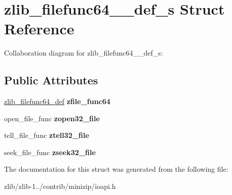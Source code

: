 \hypertarget{structzlib__filefunc64__32__def__s}{\section{zlib\+\_\+filefunc64\+\_\+\_\+def\+\_\+s Struct Reference}
\label{structzlib__filefunc64__32__def__s}
}


Collaboration diagram for zlib\+\_\+filefunc64\+\_\+\_\+def\+\_\+s\+:
\subsection*{Public Attributes}
\begin{DoxyCompactItemize}
\item 
\hypertarget{structzlib__filefunc64__32__def__s_a5b05687723a1a8cd310a73ab62fc31f5}{\hyperlink{structzlib__filefunc64__def__s}{zlib\+\_\+filefunc64\+\_\+def} {\bfseries zfile\+\_\+func64}}\label{structzlib__filefunc64__32__def__s_a5b05687723a1a8cd310a73ab62fc31f5}

\item 
\hypertarget{structzlib__filefunc64__32__def__s_a784a1cead2df16b1ce5881f32236308a}{open\+\_\+file\+\_\+func {\bfseries zopen32\+\_\+file}}\label{structzlib__filefunc64__32__def__s_a784a1cead2df16b1ce5881f32236308a}

\item 
\hypertarget{structzlib__filefunc64__32__def__s_a8ef46da9e69697b4f13cd611523761a8}{tell\+\_\+file\+\_\+func {\bfseries ztell32\+\_\+file}}\label{structzlib__filefunc64__32__def__s_a8ef46da9e69697b4f13cd611523761a8}

\item 
\hypertarget{structzlib__filefunc64__32__def__s_a2c6e18405ec9c8b2d482055e9bf06766}{seek\+\_\+file\+\_\+func {\bfseries zseek32\+\_\+file}}\label{structzlib__filefunc64__32__def__s_a2c6e18405ec9c8b2d482055e9bf06766}

\end{DoxyCompactItemize}


The documentation for this struct was generated from the following file\+:\begin{DoxyCompactItemize}
\item 
zlib/zlib-\/1../contrib/minizip/ioapi.\+h\end{DoxyCompactItemize}

